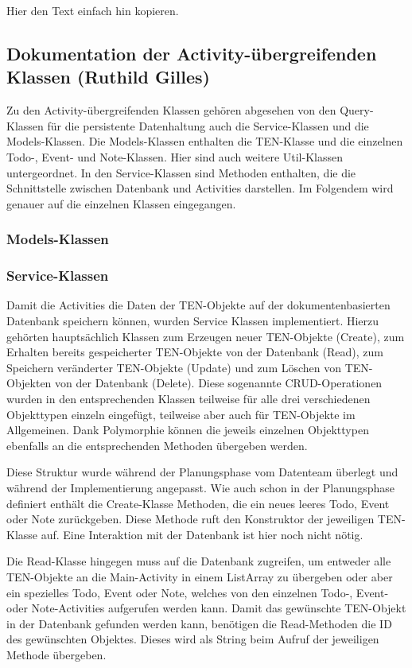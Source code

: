 Hier den Text einfach hin kopieren.

\newpage
\subsection{Dokumentation der Activity-übergreifenden Klassen (Ruthild Gilles)}

Zu den Activity-übergreifenden Klassen gehören abgesehen von den Query-Klassen für die persistente Datenhaltung auch die Service-Klassen und die Models-Klassen. Die Models-Klassen enthalten die TEN-Klasse und die einzelnen Todo-, Event- und Note-Klassen. Hier sind auch weitere Util-Klassen untergeordnet. In den Service-Klassen sind Methoden enthalten, die die Schnittstelle zwischen Datenbank und Activities darstellen. Im Folgendem wird genauer auf die einzelnen Klassen eingegangen.

\subsubsection{Models-Klassen}

\subsubsection{Service-Klassen}

Damit die Activities die Daten der TEN-Objekte auf der dokumentenbasierten Datenbank speichern können, wurden Service Klassen implementiert. Hierzu gehörten hauptsächlich Klassen zum Erzeugen neuer TEN-Objekte (Create), zum Erhalten bereits gespeicherter TEN-Objekte von der Datenbank (Read), zum Speichern veränderter TEN-Objekte (Update) und zum Löschen von TEN-Objekten von der Datenbank (Delete). Diese sogenannte CRUD-Operationen wurden in den entsprechenden Klassen teilweise für alle drei verschiedenen Objekttypen einzeln eingefügt, teilweise aber auch für TEN-Objekte im Allgemeinen. Dank Polymorphie können die jeweils einzelnen Objekttypen ebenfalls an die entsprechenden Methoden übergeben werden.

Diese Struktur wurde während der Planungsphase vom Datenteam überlegt und während der Implementierung angepasst. Wie auch schon in der Planungsphase definiert enthält die Create-Klasse Methoden, die ein neues leeres Todo, Event oder Note zurückgeben. Diese Methode ruft den Konstruktor der jeweiligen TEN-Klasse auf. Eine Interaktion mit der Datenbank ist hier noch nicht nötig.

Die Read-Klasse hingegen muss auf die Datenbank zugreifen, um entweder alle TEN-Objekte an die Main-Activity in einem ListArray zu übergeben oder aber ein spezielles Todo, Event oder Note, welches von den einzelnen Todo-, Event- oder Note-Activities aufgerufen werden kann. Damit das gewünschte TEN-Objekt in der Datenbank gefunden werden kann, benötigen die Read-Methoden die ID des gewünschten Objektes. Dieses wird als String beim Aufruf der jeweiligen Methode übergeben.

